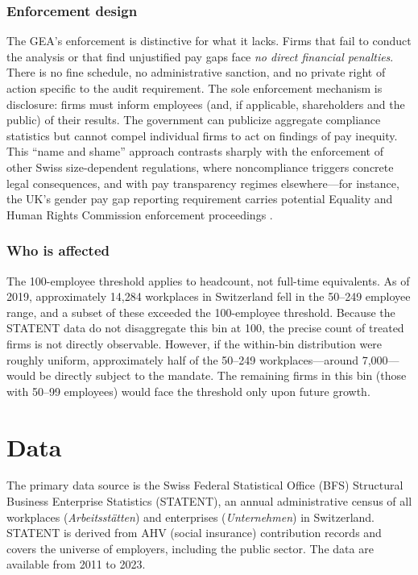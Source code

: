 \documentclass[12pt]{article}
\begin{document}
\subsubsection*{Enforcement design} The GEA's enforcement is distinctive for what it lacks. Firms that fail to conduct the analysis or that find unjustified pay gaps face \emph{no direct financial penalties}. There is no fine schedule, no administrative sanction, and no private right of action specific to the audit requirement. The sole enforcement mechanism is disclosure: firms must inform employees (and, if applicable, shareholders and the public) of their results. The government can publicize aggregate compliance statistics but cannot compel individual firms to act on findings of pay inequity. This ``name and shame'' approach contrasts sharply with the enforcement of other Swiss size-dependent regulations, where noncompliance triggers concrete legal consequences, and with pay transparency regimes elsewhere---for instance, the UK's gender pay gap reporting requirement carries potential Equality and Human Rights Commission enforcement proceedings \citep{blundell2022wage}.

\subsubsection*{Who is affected} The 100-employee threshold applies to headcount, not full-time equivalents. As of 2019, approximately 14,284 workplaces in Switzerland fell in the 50--249 employee range, and a subset of these exceeded the 100-employee threshold. Because the STATENT data do not disaggregate this bin at 100, the precise count of treated firms is not directly observable. However, if the within-bin distribution were roughly uniform, approximately half of the 50--249 workplaces---around 7,000---would be directly subject to the mandate. The remaining firms in this bin (those with 50--99 employees) would face the threshold only upon future growth.

\section{Data}

The primary data source is the Swiss Federal Statistical Office (BFS) Structural Business Enterprise Statistics (STATENT), an annual administrative census of all workplaces (\emph{Arbeitsst\"atten}) and enterprises (\emph{Unternehmen}) in Switzerland. STATENT is derived from AHV (social insurance) contribution records and covers the universe of employers, including the public sector. The data are available from 2011 to 2023.
\end{document}
